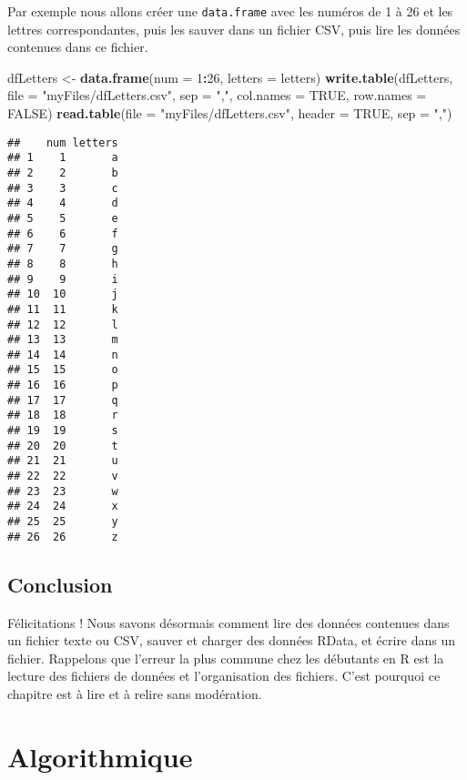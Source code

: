 \documentclass[]{book}
\newenvironment{Shaded}{\begin{snugshade}}{\end{snugshade}}
\newcommand{\KeywordTok}[1]{\textcolor[rgb]{0.13,0.29,0.53}{\textbf{#1}}}
\newcommand{\DataTypeTok}[1]{\textcolor[rgb]{0.13,0.29,0.53}{#1}}
\newcommand{\DecValTok}[1]{\textcolor[rgb]{0.00,0.00,0.81}{#1}}
\newcommand{\StringTok}[1]{\textcolor[rgb]{0.31,0.60,0.02}{#1}}
\newcommand{\OtherTok}[1]{\textcolor[rgb]{0.56,0.35,0.01}{#1}}
\newcommand{\OperatorTok}[1]{\textcolor[rgb]{0.81,0.36,0.00}{\textbf{#1}}}
\newcommand{\NormalTok}[1]{#1}
\theoremstyle{definition}
\theoremstyle{definition}
\theoremstyle{definition}
\theoremstyle{remark}
\begin{document}
Par exemple nous allons créer une \texttt{data.frame} avec les numéros
de 1 à 26 et les lettres correspondantes, puis les sauver dans un
fichier CSV, puis lire les données contenues dans ce fichier.

\begin{Shaded}
\begin{Highlighting}[]
\NormalTok{dfLetters <-}\StringTok{ }\KeywordTok{data.frame}\NormalTok{(}\DataTypeTok{num =} \DecValTok{1}\OperatorTok{:}\DecValTok{26}\NormalTok{, }\DataTypeTok{letters =}\NormalTok{ letters)}
\KeywordTok{write.table}\NormalTok{(dfLetters, }\DataTypeTok{file =} \StringTok{"myFiles/dfLetters.csv"}\NormalTok{, }
  \DataTypeTok{sep =} \StringTok{","}\NormalTok{, }\DataTypeTok{col.names =} \OtherTok{TRUE}\NormalTok{, }\DataTypeTok{row.names =} \OtherTok{FALSE}\NormalTok{)}
\KeywordTok{read.table}\NormalTok{(}\DataTypeTok{file =} \StringTok{"myFiles/dfLetters.csv"}\NormalTok{, }\DataTypeTok{header =} \OtherTok{TRUE}\NormalTok{, }\DataTypeTok{sep =} \StringTok{","}\NormalTok{)}
\end{Highlighting}
\end{Shaded}

\begin{verbatim}
##    num letters
## 1    1       a
## 2    2       b
## 3    3       c
## 4    4       d
## 5    5       e
## 6    6       f
## 7    7       g
## 8    8       h
## 9    9       i
## 10  10       j
## 11  11       k
## 12  12       l
## 13  13       m
## 14  14       n
## 15  15       o
## 16  16       p
## 17  17       q
## 18  18       r
## 19  19       s
## 20  20       t
## 21  21       u
## 22  22       v
## 23  23       w
## 24  24       x
## 25  25       y
## 26  26       z
\end{verbatim}

\section{Conclusion}\label{conclusion-5}

Félicitations ! Nous savons désormais comment lire des données contenues
dans un fichier texte ou CSV, sauver et charger des données RData, et
écrire dans un fichier. Rappelons que l'erreur la plus commune chez les
débutants en R est la lecture des fichiers de données et l'organisation
des fichiers. C'est pourquoi ce chapitre est à lire et à relire sans
modération.

\chapter{Algorithmique}\label{algo}
\end{document}
